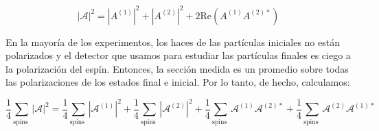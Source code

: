 \begin{equation}
|\mathcal{A}|^2 = |A^{(1)}|^2 + |A^{(2)}|^2 + 2 \text{Re} \left( A^{(1)} A^{(2)*} \right)
\end{equation}

En la mayoría de los experimentos, los haces de las partículas iniciales no están polarizados y el detector que usamos para estudiar las partículas finales es ciego a la polarización del espín. Entonces, la sección medida es un promedio sobre todas las polarizaciones de los estados final e inicial. Por lo tanto, de hecho, calculamos:

\begin{equation}
  \frac{1}{4} \sum_{\text {spins }}|\mathcal{A}|^2=\frac{1}{4} \sum_{\text {spins }}\left|\mathcal{A}^{(1)}\right|^2+\frac{1}{4} \sum_{\text {spins }}\left|\mathcal{A}^{(2)}\right|^2+\frac{1}{4} \sum_{\text {spins }} \mathcal{A}^{(1)} \mathcal{A}^{(2) *}+\frac{1}{4} \sum_{\text {spins }} \mathcal{A}^{(2)} \mathcal{A}^{(1) *}
  \end{equation}

